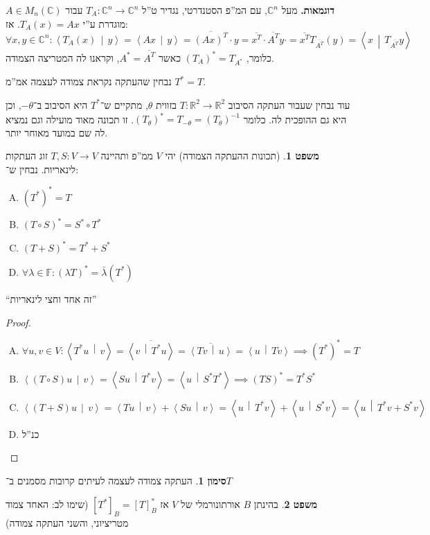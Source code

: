 \documentclass[a4paper]{article}
\newcommand\R     {\mathbb{R}}
\newcommand\C     {\mathbb{C}}
\newcommand\ra    {\rangle}
\newcommand\la    {\langle}
\newcommand\ol    {\overline}
\newcommand\F         {\mathbb{F}}
\newcommand\co        {\colon}
\newcommand\mut [2]   {\left \la #1 \,\middle\vert\, #2 \right \ra}
\newcommand\tg        {\theta}
\renewcommand\lg      {\lambda}
\newcommand\op    {^{-1}}
\theoremstyle{definition}
\newtheorem{Theorem}{משפט}
\newtheorem{Notion}{סימון}
\newcommand\theo  [1] {\begin{Theorem}#1\end{Theorem}}
\newcommand\noti  [1] {\begin{Notion}#1\end{Notion}}
\begin{document}
	\textbf{דוגמאות. }
	מעל $\C^n$, עם המ''פ הסטנדרטי, נגדיר ט''ל $T_A \co \C^n \to \C^n$ עבור $A \in M_n(\C)$ מוגדרת ע''י $T_A(x) = Ax$. אז: 
	\[ \forall x, y \in \C^n \co \mut{T_A(x)}{y} = \mut{Ax}{y} = \ol{(Ax)^T} \cdot y = \ol{x^T}\cdot\ol{A^T}y\cdot = \ol{x^T}T_{\ol{A^T}}(y) = \mut{x}{T_{\ol{A^T}}y} \]
	כלומר, $(T_A)^* = T_{A^*}$ כאשר $A^* = \ol{A^T}$, וקראנו לה המטריצה הצמודה. 
	
	נבחין שהעתקה נקראת צמודה לעצמה אמ''מ $T^* = T$. 
	
	עוד נבחין שעבור העתקה הסיבוב $T \co \R^2 \to \R^2$ בזווית $\tg$, מתקיים ש־$T^*$ היא הסיבוב ב־$-\tg$, וכן היא גם ההופכית לה. כלומר $(T_{\tg})^* = T_{-\tg} = (T_\tg)\op$. זו תכונה מאוד מועילה וגם נמציא לה שם במועד מאוחר יותר. 
	
	\theo{(תכונות ההעתקה הצמודה) יהי $V$ ממ''פ ותהיינה $T, S \co V \to V$ זוג העתקות לינאריות. נבחין ש־: 
		\begin{enumerate}[(A)]
			\item \hfil $(T^*)^* = T$
			\item \hfil $(T \circ S)^* = S^* \circ T^*$
			\item \hfil $(T + S)^* = T^* + S^*$
			\item \hfil $\forall \lg \in \F \co (\lg T)^* = \bar \lg (T^*)$
	\end{enumerate}}
	``זה אחד וחצי לינאריות''
	
	\begin{proof}\,
		\begin{enumerate}[A)]
			\item \hfil $\forall u, v \in V \co \mut{T^* u}{v} = \ol{\mut{v}{T^* u}}  = \ol{\mut{Tv}{u}}  = \mut{u}{Tv} \implies (T^*)^* = T$
			\item \hfil $\mut{(T \circ S) u}{v} = \mut{Su}{T^*v} = \mut{u}{S^* T^*} \implies (TS)^* = T^*S^*$
			\item \hfil $\mut{(T + S)u}{v} = \mut{Tu}{v} + \mut{Su}{v} = \mut{u}{T^*v} + \mut{u}{S^*v}  = \mut{u}{T^*v + S^*v}$
			\item כנ''ל
		\end{enumerate}
	\end{proof}
	
	\noti{העתקה צמודה לעצמה לעיתים קרובות מסמנים ב־$T^{}$}
	
	\theo{בהינתן $B$ אורתונורמלי של $V$ אז $[T^*]_B = [T]^*_B$ (שימו לב: האחד צמוד מטריציוני, והשני העתקה צמודה)}
	
\end{document}
